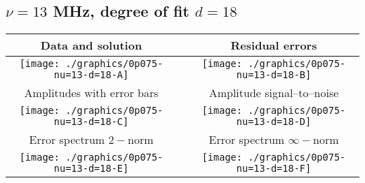 

% 

\clearpage{}
\break{}

\subsection{$\nu = 13$ MHz, degree of fit $d = 18$}

\begin{table}[h]
    \begin{center}
        \begin{tabular}{ccc}
            Data and solution & \quad & Residual errors \\\hline
            \texttt{[image: ./graphics/0p075-nu=13-d=18-A]} &&
            \texttt{[image: ./graphics/0p075-nu=13-d=18-B]} \\[15pt]
            Amplitudes with error bars && Amplitude signal--to--noise \\\hline
            \texttt{[image: ./graphics/0p075-nu=13-d=18-C]} &&
            \texttt{[image: ./graphics/0p075-nu=13-d=18-D]} \\[15pt]
            Error spectrum $2-$norm && Error spectrum $\infty-$norm \\\hline
            \texttt{[image: ./graphics/0p075-nu=13-d=18-E]} &&
            \texttt{[image: ./graphics/0p075-nu=13-d=18-F]} \\[15pt]
        \end{tabular}
    \end{center}
\label{fig:elev=75, nu=13}
\end{table}



\endinput
